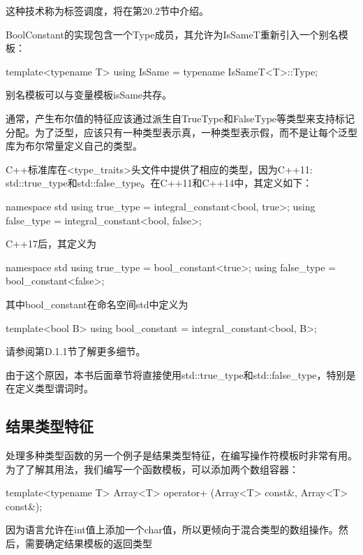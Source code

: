这种技术称为标签调度，将在第20.2节中介绍。

BoolConstant的实现包含一个Type成员，其允许为IsSameT重新引入一个别名模板：

\begin{cpp}
template<typename T>
using IsSame = typename IsSameT<T>::Type;
\end{cpp}

别名模板可以与变量模板isSame共存。

通常，产生布尔值的特征应该通过派生自TrueType和FalseType等类型来支持标记分配。为了泛型，应该只有一种类型表示真，一种类型表示假，而不是让每个泛型库为布尔常量定义自己的类型。

C++标准库在<type\_traits>头文件中提供了相应的类型，因为C++11: std::true\_type和std::false\_type。在C++11和C++14中，其定义如下：

\begin{cpp}
namespace std {
	using true_type = integral_constant<bool, true>;
	using false_type = integral_constant<bool, false>;
}
\end{cpp}

C++17后，其定义为

\begin{cpp}
namespace std {
	using true_type = bool_constant<true>;
	using false_type = bool_constant<false>;
}
\end{cpp}

其中bool\_constant在命名空间std中定义为

\begin{cpp}
template<bool B>
using bool_constant = integral_constant<bool, B>;
\end{cpp}

请参阅第D.1.1节了解更多细节。

由于这个原因，本书后面章节将直接使用std::true\_type和std::false\_type，特别是在定义类型谓词时。

\subsection{结果类型特征} 

处理多种类型函数的另一个例子是结果类型特征，在编写操作符模板时非常有用。为了了解其用法，我们编写一个函数模板，可以添加两个数组容器：

\begin{cpp}
template<typename T>
Array<T> operator+ (Array<T> const&, Array<T> const&);
\end{cpp}

因为语言允许在int值上添加一个char值，所以更倾向于混合类型的数组操作。然后，需要确定结果模板的返回类型

